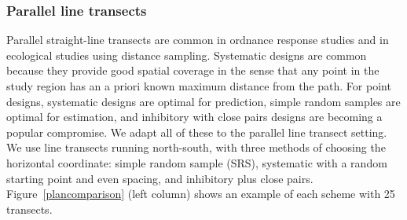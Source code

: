 \documentclass[review]{elsarticle}
\begin{document}
\subsubsection{Parallel line transects}

Parallel straight-line transects are common in ordnance response studies and in
ecological studies using distance sampling. Systematic designs are common
because they provide good spatial coverage in the sense that any point in the
study region has an a priori known maximum distance from the path. For point
designs, systematic designs are optimal for prediction, simple random samples
are optimal for estimation, and inhibitory with close pairs designs are
becoming a popular compromise. We adapt all of these to the parallel line
transect setting. We use line transects running north-south, with three methods
of choosing the horizontal coordinate: simple random sample (SRS), systematic
with a random starting point and even spacing, and inhibitory plus close pairs.
Figure~\ref{plancomparison} (left column) shows an example of each scheme with
25 transects.

\end{document}
